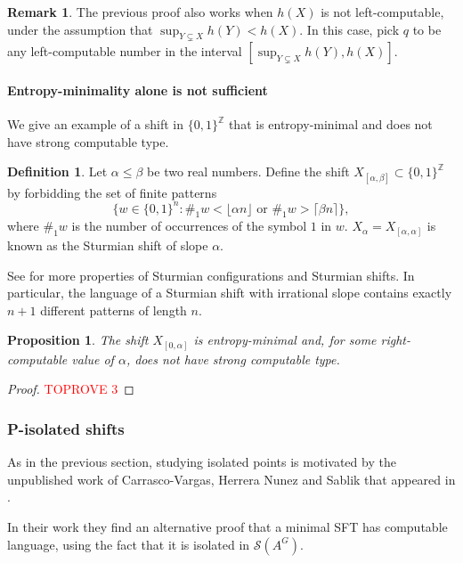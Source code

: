 \documentclass[french,american]{article}
\theoremstyle{plain}
\newtheorem{proposition}[theorem]{Proposition}
\theoremstyle{definition}
\newtheorem{definition}[theorem]{Definition}
\newtheorem{remark}[theorem]{Remark}
\theoremstyle{remark}
\theoremstyle{plain}
\begin{document}
\begin{remark}
The previous proof also works when $h(X)$ is not left-computable, under the assumption that $\sup_{Y\subsetneq X} h(Y) < h(X)$. In this case, pick $q$ to be any left-computable number in the interval $[\sup_{Y\subsetneq X} h(Y), h(X)]$.
\end{remark}

\paragraph*{Entropy-minimality alone is not sufficient}

We give an example of a shift in $\{0,1\}^{\mathbb{Z}}$ that is entropy-minimal
and does not have strong computable type.
\begin{definition}
\label{def:sturmian}Let $\alpha\leq\beta$ be two real numbers. Define
the shift $X_{[\alpha,\beta]}\subset\{0,1\}^{\mathbb{Z}}$ by forbidding
the set of finite patterns 
\[
\{w\in\{0,1\}^{n}:\#_{1}w<\lfloor\alpha n\rfloor\text{ or }\#_{1}w>\lceil\beta n\rceil\},
\]
where $\#_{1}w$ is the number of occurrences of the symbol $1$ in
$w$. $X_{\alpha}=X_{[\alpha,\alpha]}$ is known as the Sturmian shift
of slope $\alpha$.
 \end{definition}

See \cite[Chapter 2]{lothaire2002algebraic} for more properties of
Sturmian configurations and Sturmian shifts. In particular, the language
of a Sturmian shift with irrational slope contains exactly $n+1$
different patterns of length $n$.
\begin{proposition}
\label{Prop:entropyminimal} The shift $X_{[0,\alpha]}$ is entropy-minimal and, for some right-computable value of $\alpha$, does not have strong computable type.
\end{proposition}

\begin{proof}\textcolor{red}{TOPROVE 3}\end{proof}

\subsubsection{P-isolated shifts}

As in the previous section, studying isolated points is motivated by the unpublished work
of Carrasco-Vargas, Herrera Nunez and Sablik that appeared in \cite{Phdnicanor2024}.

In their work they find an alternative proof that a minimal SFT has computable language,
using the fact that it is isolated in $\mathcal{S}(A^{G})$.
\end{document}
